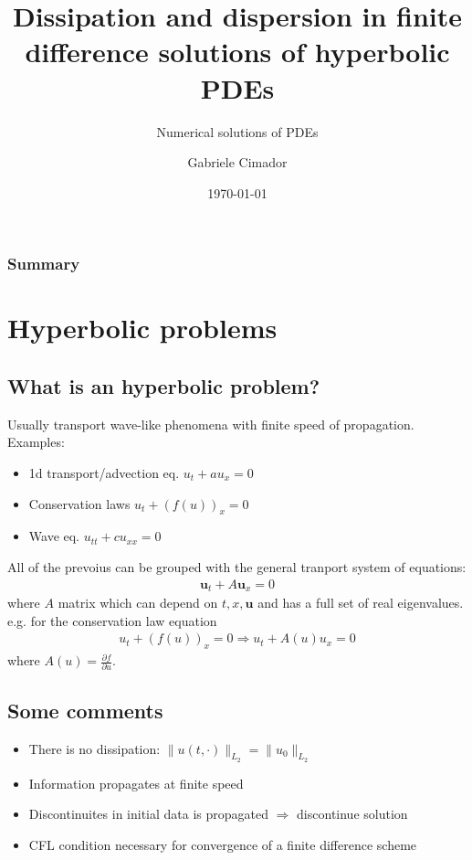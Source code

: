 \documentclass{beamer}
\title{Dissipation and dispersion in finite difference solutions of hyperbolic PDEs}
\subtitle{Numerical solutions of PDEs}
\author{Gabriele Cimador}
\institute{Data Science and Scientific computing at Università di Trieste}
\date{\today}
\begin{document}
\begin{frame}
\titlepage
\end{frame}
\begin{frame}
\frametitle{Summary}
\tableofcontents
\end{frame}
\section{Hyperbolic problems}
\subsection{What is an hyperbolic problem?}
\begin{frame}
Usually transport wave-like phenomena with finite speed of propagation. Examples:
\begin{itemize}
  \item 1d transport/advection eq. $u_t + a u_x = 0$
  \item Conservation laws $u_t + (f(u))_x = 0$
  \item Wave eq. $u_{tt} + cu_{xx} = 0$
\end{itemize}
\end{frame}
\begin{frame}
All of the prevoius can be grouped with the general tranport system of equations:
\begin{align*}
\bm{u}_t + A\bm{u}_x = 0
\end{align*}
where $A$ matrix which can depend on $t, x, \bm{u}$ and has a full set of real eigenvalues.
\\ e.g. for the conservation law equation
\begin{align*}
u_t + (f(u))_x = 0 \Rightarrow u_t + A(u)u_x = 0
\end{align*}
 where $A(u) = \frac{\partial f}{\partial u}$.
\end{frame}
\subsection{Some comments}
\begin{frame}
\begin{itemize}
  \item There is no dissipation: $\lVert u(t,\cdot) \rVert_{L_2} = \lVert u_0\rVert_{L_2}$
  \item Information propagates at finite speed
  \item Discontinuites in initial data is propagated $\Rightarrow$ discontinue solution
  \item CFL condition necessary for convergence of a finite difference scheme
\end{itemize}
\end{frame}
\end{document}
